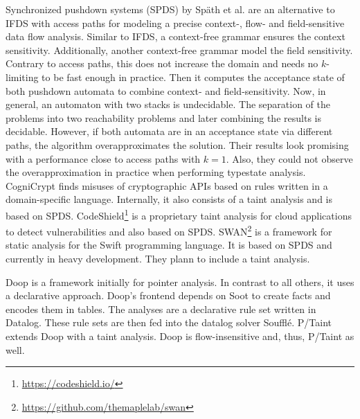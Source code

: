 \documentclass[../draft.tex]{subfiles}
\begin{document}
    Synchronized pushdown systems (SPDS) by Späth et al.\cite{Spaeth2019} are an alternative to IFDS with access paths for modeling a precise context-, flow- and field-sensitive data flow analysis.
    Similar to IFDS, a context-free grammar ensures the context sensitivity.
    Additionally, another context-free grammar model the field sensitivity.
    Contrary to access paths, this does not increase the domain and needs no $k$-limiting to be fast enough in practice.
    Then it computes the acceptance state of both pushdown automata to combine context- and field-sensitivity.
    Now, in general, an automaton with two stacks is undecidable.
    The separation of the problems into two reachability problems and later combining the results is decidable.
    However, if both automata are in an acceptance state via different paths, the algorithm overapproximates the solution.
    Their results look promising with a performance close to access paths with $k=1$.
    Also, they could not observe the overapproximation in practice when performing typestate analysis.\\
    CogniCrypt \cite{Krueger2017} finds misuses of cryptographic APIs based on rules written in a domain-specific language.
    Internally, it also consists of a taint analysis and is based on SPDS.
    CodeShield\footnote{\url{https://codeshield.io/}} is a proprietary taint analysis for cloud applications to detect vulnerabilities and also based on SPDS.
    SWAN\footnote{\url{https://github.com/themaplelab/swan}} is a framework for static analysis for the Swift programming language. It is based on SPDS and currently in heavy development.
    They plann to include a taint analysis.

    Doop\cite{Bravenboer2009} is a framework initially for pointer analysis.
    In contrast to all others, it uses a declarative approach.
    Doop's frontend depends on Soot to create facts and encodes them in tables.
    The analyses are a declarative rule set written in Datalog.
    These rule sets are then fed into the datalog solver Soufflé\cite{Scholz2016}.
    P/Taint\cite{Grech2017} extends Doop with a taint analysis.
    Doop is flow-insensitive and, thus, P/Taint as well.
\end{document}
